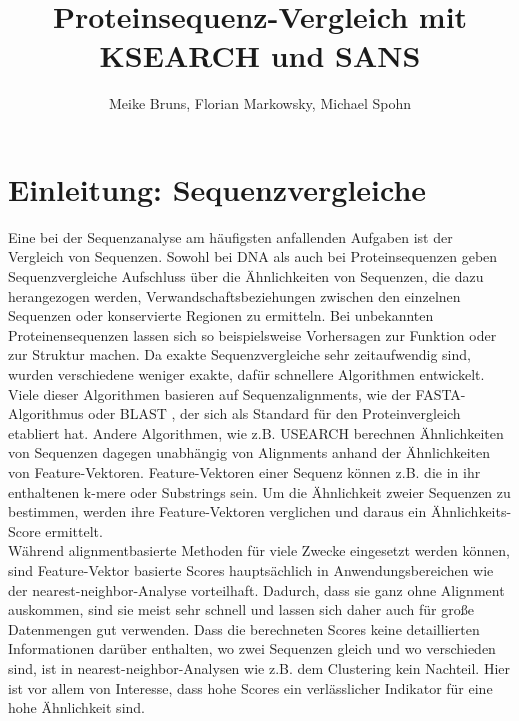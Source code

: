 \documentclass{article}
\title{Proteinsequenz-Vergleich mit KSEARCH und SANS}
\author{Meike Bruns, Florian Markowsky, Michael Spohn}
\begin{document}
\maketitle
\thispagestyle{empty}
\begin{abstract}
\end{abstract}
\newpage

\tableofcontents
\thispagestyle{empty}
\newpage

\section{Einleitung: Sequenzvergleiche}

Eine bei der Sequenzanalyse am häufigsten anfallenden Aufgaben ist der Vergleich
von Sequenzen. 
Sowohl bei DNA als auch bei Proteinsequenzen geben Sequenzvergleiche Aufschluss über die Ähnlichkeiten von Sequenzen, die dazu herangezogen werden, Verwandschaftsbeziehungen zwischen den einzelnen Sequenzen oder konservierte Regionen zu ermitteln. Bei unbekannten Proteinensequenzen lassen sich so beispielsweise Vorhersagen zur Funktion oder zur Struktur machen. Da exakte Sequenzvergleiche sehr zeitaufwendig sind, wurden verschiedene weniger exakte, dafür schnellere Algorithmen entwickelt.\\
Viele dieser Algorithmen basieren auf Sequenzalignments, wie der FASTA-Algorithmus \cite{FASTA} oder BLAST \cite{BLAST}, der sich als Standard für den Proteinvergleich etabliert hat.
Andere Algorithmen, wie z.B. USEARCH \cite{USEARCH} berechnen Ähnlichkeiten von Sequenzen dagegen unabhängig von Alignments anhand der Ähnlichkeiten von Feature-Vektoren. 
Feature-Vektoren einer Sequenz können z.B. die in ihr enthaltenen k-mere oder Substrings sein. 
Um die Ähnlichkeit zweier Sequenzen zu bestimmen, werden ihre Feature-Vektoren verglichen und daraus ein Ähnlichkeits-Score ermittelt.\\
Während alignmentbasierte Methoden für viele Zwecke eingesetzt werden können, sind Feature-Vektor basierte Scores hauptsächlich in Anwendungsbereichen wie der nearest-neighbor-Analyse vorteilhaft. 
Dadurch, dass sie ganz ohne Alignment auskommen, sind sie meist sehr schnell und lassen sich daher auch für große Datenmengen gut verwenden. 
Dass die berechneten Scores keine detaillierten Informationen darüber enthalten,
wo zwei Sequenzen gleich und wo verschieden sind, ist in nearest-neighbor-Analysen wie z.B. dem Clustering kein Nachteil. 
Hier ist vor allem von Interesse, dass hohe Scores ein verlässlicher Indikator für eine hohe Ähnlichkeit sind.\\
\end{document}
